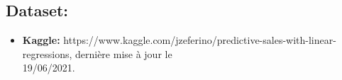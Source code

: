 \documentclass[a4paper]{report}
\begin{document}
\begin{doublespace}
\begin{doublespace}
\begin{doublespace}
\begin{doublespace}
\begin{doublespace}
\begin{doublespace}
                        \subsection{Dataset:}
                        \begin{itemize}
                            \item \textbf{Kaggle:} https://www.kaggle.com/jzeferino/predictive-sales-with-linear-regressions, dernière mise à jour le\\ 19/06/2021.
                        \end{itemize}
                    \end{doublespace}
                \end{doublespace}
            \end{doublespace}
        \end{doublespace}
    \end{doublespace}
\end{doublespace}
\end{document}
